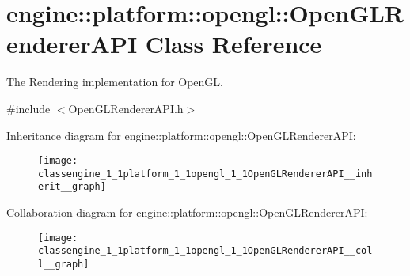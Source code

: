 \hypertarget{classengine_1_1platform_1_1opengl_1_1OpenGLRendererAPI}{}\section{engine\+:\+:platform\+:\+:opengl\+:\+:Open\+G\+L\+Renderer\+A\+PI Class Reference}
\label{classengine_1_1platform_1_1opengl_1_1OpenGLRendererAPI}


The Rendering implementation for Open\+GL.  




{\ttfamily \#include $<$Open\+G\+L\+Renderer\+A\+P\+I.\+h$>$}



Inheritance diagram for engine\+:\+:platform\+:\+:opengl\+:\+:Open\+G\+L\+Renderer\+A\+PI\+:
\nopagebreak
\begin{figure}[H]
\begin{center}
\leavevmode
\texttt{[image: classengine\_1\_1platform\_1\_1opengl\_1\_1OpenGLRendererAPI\_\_inherit\_\_graph]}
\end{center}
\end{figure}


Collaboration diagram for engine\+:\+:platform\+:\+:opengl\+:\+:Open\+G\+L\+Renderer\+A\+PI\+:
\nopagebreak
\begin{figure}[H]
\begin{center}
\leavevmode
\texttt{[image: classengine\_1\_1platform\_1\_1opengl\_1\_1OpenGLRendererAPI\_\_coll\_\_graph]}
\end{center}
\end{figure}
